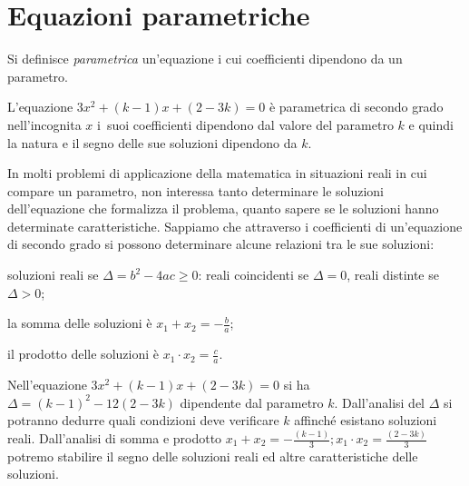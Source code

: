 \section{Equazioni parametriche}
\label{sec:eq2gr_parametriche}

\begin{definizione}
Si definisce \emph{parametrica} un'equazione i cui coefficienti dipendono da un 
parametro.
\end{definizione}
L'equazione $3 x^{2} + ( k - 1 ) x + ( 2 - 3 k ) = 0$ è parametrica di secondo 
grado nell'incognita $x$ i~suoi coefficienti dipendono dal valore del parametro 
$k$ e quindi la natura e il segno delle sue soluzioni dipendono da $k$.

In molti problemi di applicazione della matematica in situazioni reali in cui 
compare un parametro, non interessa tanto determinare le soluzioni 
dell'equazione che formalizza il problema, quanto sapere se le soluzioni hanno 
determinate caratteristiche.
Sappiamo che attraverso i coefficienti di un'equazione di secondo grado si 
possono determinare alcune relazioni tra le sue soluzioni:
\begin{itemize*}
\item soluzioni reali se $\Delta = b^{2} - 4 a c \geq 0$:
 \subitem reali coincidenti se $\Delta = 0$, 
 \subitem reali distinte se $\Delta > 0$;
\item la somma delle soluzioni è $x_{1} + x_{2} = - \frac{b}{a}$;
\item il prodotto delle soluzioni è $x_{1} \cdot x_{2} = \frac{c}{a}$.
\end{itemize*}

Nell'equazione $3 x^{2} + ( k - 1 ) x + ( 2 - 3 k ) = 0$ si ha $\Delta = ( k - 1 
)^{2} - 12 ( 2 - 3 k )$ dipendente dal parametro $k$.
Dall'analisi del $\Delta$ si potranno dedurre quali condizioni deve verificare 
$k$ affinché esistano soluzioni reali. Dall'analisi di somma e prodotto
$x_{1} + x_{2} = - \frac{( k - 1 )}{3}; x_{1} \cdot x_{2} =\frac{( 2 - 3 k 
)}{3}$ potremo stabilire il segno delle soluzioni reali ed altre caratteristiche 
delle soluzioni.

